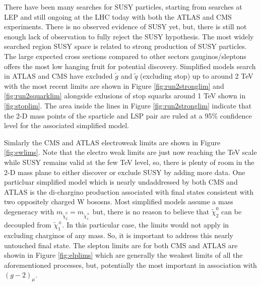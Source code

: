 There have been many searches for SUSY particles, starting from searches at LEP and still ongoing at the LHC today with both the ATLAS and CMS experiments. There is no observed evidence of SUSY yet, but, there is still not enough lack of observation to fully reject the SUSY hypothesis. The most widely searched region SUSY space is related to strong production of SUSY particles. The large expected cross sections compared to other sectors gauginos/sleptons offers the most low hanging fruit for potential discovery.
Simplified models search in ATLAS and CMS have excluded $\tilde{g}$ and $\tilde{q}$ (excluding stop) up to around 2 TeV with the most recent limits are shown in Figure \ref{fig:run2stronglim} and \ref{fig:run2squarklim} alongside exlusions of stop squarks around 1 TeV shown in \ref{fig:stoplim}. The area inside the lines in Figure \ref{fig:run2stronglim} indicate that the 2-D mass points of the sparticle and LSP pair are ruled at a 95\% confidence level for the associated simplified model.



Simlarly the CMS and ATLAS electroweak limits are shown in Figure \ref{fig:ewlims}. Note that the electro weak limits are just now reaching the TeV scale while SUSY remains valid at the few TeV level, so, there is plenty of room in the 2-D mass plane to either discover or exclude SUSY by adding more data. One particluar simplified model which is nearly undaddressed by both CMS and ATLAS is the di-chargino production associated with final states consistent with two oppositely charged W bososns.  Most simplified models assume a mass degeneracy with $m_{\tilde{\chi}^0_2} = m_{\tilde{\chi}^\pm_1}$ but, there is no reason to believe that $\tilde{\chi}^0_2$ can be decoupled from $\tilde{\chi}^\pm_1$. In this particular case, the limits would not apply in excluding charginos of any mass. So, it is important to address this nearly untouched final state. The slepton limits are for both CMS and ATLAS are showin in Figure \ref{fig:elplims} which are generally the weakest limits of all the aforementioned processes, but, potentially the most important in association with $(g-2)_\mu$.



